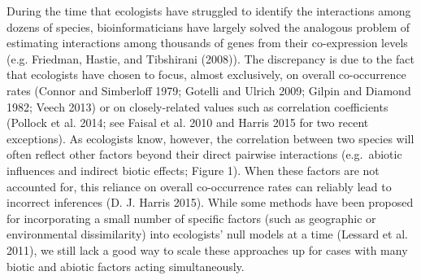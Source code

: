 During the time that ecologists have struggled to identify the
interactions among dozens of species, bioinformaticians have largely
solved the analogous problem of estimating interactions among thousands
of genes from their co-expression levels (e.g. Friedman, Hastie, and
Tibshirani (2008)). The discrepancy is due to the fact that ecologists
have chosen to focus, almost exclusively, on overall co-occurrence rates
(Connor and Simberloff 1979; Gotelli and Ulrich 2009; Gilpin and Diamond
1982; Veech 2013) or on closely-related values such as correlation
coefficients (Pollock et al. 2014; see Faisal et al. 2010 and Harris
2015 for two recent exceptions). As ecologists know, however, the
correlation between two species will often reflect other factors beyond
their direct pairwise interactions (e.g.~abiotic influences and indirect
biotic effects; Figure 1). When these factors are not accounted for,
this reliance on overall co-occurrence rates can reliably lead to
incorrect inferences (D. J. Harris 2015). While some methods have been
proposed for incorporating a small number of specific factors (such as
geographic or environmental dissimilarity) into ecologists' null models
at a time (Lessard et al. 2011), we still lack a good way to scale these
approaches up for cases with many biotic and abiotic factors acting
simultaneously.

